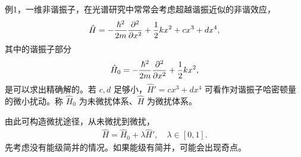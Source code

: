 例1，一维非谐振子，在光谱研究中常常会考虑超越谐振近似的非谐效应，
\begin{align}
    \hat H = -\frac{\hbar^2}{2m} \pdv[2]{x} + \frac12 kx^2 + cx^3 + dx^4,
\end{align}
其中的谐振子部分
\begin{align}
    \hat H_0 = -\frac{\hbar^2}{2m} \pdv[2]{x} + \frac12 kx^2, 
\end{align}
是可以求出精确解的。若 $c,d$ 足够小，$\hat H' = cx^3 + dx^4$ 可看作对谐振子哈密顿量的微小扰动。称 $\hat H_0$ 为未微扰体系、$\hat H$ 为微扰体系。

由此可构造微扰途径，从未微扰到微扰，
\begin{align}
    \hat H = \hat H_0 + \lambda \hat H', \quad \lambda\in[0,1]. 
\end{align}
先考虑没有能级简并的情况。如果能级有简并，可能会出现奇点。

